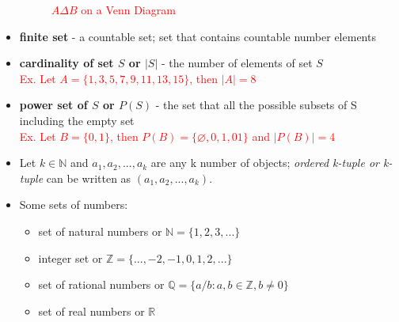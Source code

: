 \begin{itemize}
\begin{itemize}
\end{itemize}
\begin{figure}[h]
	\centering
\caption{\textcolor{red}{$A \Delta B$ on a Venn Diagram}}
	\end{figure}

 \item \textbf{finite set} - a countable set; set that contains countable number elements
 \item  \textbf{cardinality of set $S$ or $|S|$} - the number of elements of set $S$\\
 \textcolor{red}{Ex. Let $A=\{1,3,5,7,9,11,13,15\}$, then $|A|=8$}
 \item \textbf{power set of $S$ or $P(S)$} - the set that all the possible subsets of S including the empty set\\
 \textcolor{red}{Ex. Let $B=\{0,1\}$, then $P(B)=\{\varnothing,0,1,01\}$ and $|P(B)|=4$}
 \item Let $k \in \mathbb{N}$ and $a_1,a_2,...,a_k$ are any k number of objects; \textit{ordered k-tuple or k-tuple} can be written as $(a_1,a_2,...,a_k)$.
 \item Some sets of numbers:
 \begin{itemize}
 	\item set of natural numbers or $\mathbb{N} = \{1,2,3,...\}$
 	\item integer set or $\mathbb{Z} = \{...,-2,-1,0,1,2,...\}$
 	\item set of rational numbers or $\mathbb{Q} = \{a/b:a,b \in \mathbb{Z},b\neq 0 \}$
 	\item set of real numbers or $\mathbb{R}$
 \end{itemize}
\end{itemize}

